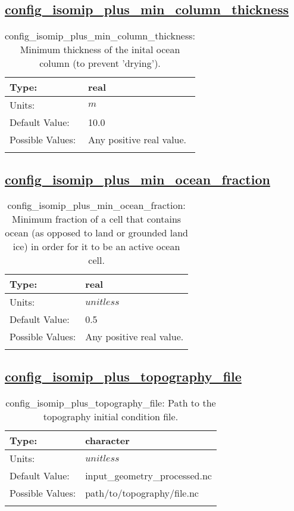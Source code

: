 \subsection[config\_isomip\_plus\_min\_column\_thickness]{\hyperref[sec:nm_tab_isomip_plus]{config\_isomip\_plus\_min\_column\_thickness}}
\label{subsec:nm_sec_config_isomip_plus_min_column_thickness}
\begin{center}
\begin{longtable}{| p{2.0in} || p{4.0in} |}
    \hline
    Type: & real \\
    \hline
    Units: & $m$ \\
    \hline
    Default Value: & 10.0 \\
    \hline
    Possible Values: & Any positive real value. \\
    \hline
    \caption{config\_isomip\_plus\_min\_column\_thickness: Minimum thickness of the inital ocean column (to prevent 'drying').}
\end{longtable}
\end{center}
\subsection[config\_isomip\_plus\_min\_ocean\_fraction]{\hyperref[sec:nm_tab_isomip_plus]{config\_isomip\_plus\_min\_ocean\_fraction}}
\label{subsec:nm_sec_config_isomip_plus_min_ocean_fraction}
\begin{center}
\begin{longtable}{| p{2.0in} || p{4.0in} |}
    \hline
    Type: & real \\
    \hline
    Units: & $unitless$ \\
    \hline
    Default Value: & 0.5 \\
    \hline
    Possible Values: & Any positive real value. \\
    \hline
    \caption{config\_isomip\_plus\_min\_ocean\_fraction: Minimum fraction of a cell that contains ocean (as opposed to land or grounded land ice) in order for it to be an active ocean cell.}
\end{longtable}
\end{center}
\subsection[config\_isomip\_plus\_topography\_file]{\hyperref[sec:nm_tab_isomip_plus]{config\_isomip\_plus\_topography\_file}}
\label{subsec:nm_sec_config_isomip_plus_topography_file}
\begin{center}
\begin{longtable}{| p{2.0in} || p{4.0in} |}
    \hline
    Type: & character \\
    \hline
    Units: & $unitless$ \\
    \hline
    Default Value: & input\_geometry\_processed.nc \\
    \hline
    Possible Values: & path/to/topography/file.nc \\
    \hline
    \caption{config\_isomip\_plus\_topography\_file: Path to the topography initial condition file.}
\end{longtable}
\end{center}
